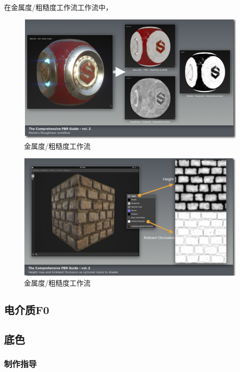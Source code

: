 在金属度/粗糙度工作流工作流中，

\begin{figure}[ht]
    \centering
	\includegraphics[width=\textwidth]{images/chap2_2.png}
	\caption{金属度/粗糙度工作流}
    \label{fig:chap2_2}
\end{figure}

\begin{figure}[ht]
    \centering
	\includegraphics[width=\textwidth]{images/chap2_3.png}
	\caption{金属度/粗糙度工作流}
    \label{fig:chap2_3}
\end{figure}

\subsection{电介质F0}

\subsection{底色}

\subsubsection{制作指导}

